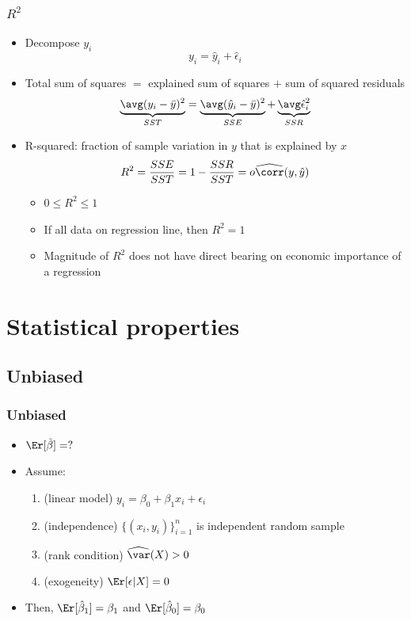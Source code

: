 \begin{frame}
  \frametitle{$R^2$}
  \begin{itemize}
  \item Decompose $y_i$
    \[ y_i = \hat{y}_i + \hat{\epsilon}_i \]
  \item Total sum of squares $=$ explained sum of squares $+$ sum of
    squared residuals
    \[ \underbrace{\avg (y_i - \bar{y})^2}_{SST} =
    \underbrace{\avg (\hat{y}_i - \bar{y})^2}_{SSE} +
    \underbrace{\avg \hat{\epsilon}_i^2}_{SSR} \]
  \item \alert{R-squared}: fraction of sample variation in $y$ that is
    explained by $x$
    \[ R^2 = \frac{SSE}{SST} = 1 - \frac{SSR}{SST} =o
    \widehat{\corr}(y,\hat{y}) \]
    \begin{itemize}
    \item $0 \leq R^2 \leq 1$
    \item If all data on regression line, then $R^2 = 1$
    \item Magnitude of $R^2$ does not have direct bearing on economic
      importance of a regression
    \end{itemize}
  \end{itemize}
\end{frame}

\section{Statistical properties}

\subsection{Unbiased}
\begin{frame}
  \frametitle{Unbiased}
  \begin{itemize}
  \item $\Er[\hat{\beta}] = ?$
  \item Assume:
    \begin{enumerate}
    \item[SLR.1]\label{s1} (linear model) $ y_i = \beta_0 + \beta_1
      x_i + \epsilon_i $
    \item[SLR.2]\label{s2} (independence) $\{(x_i,y_i)\}_{i=1}^n$ is independent random
      sample
    \item[SLR.3]\label{s3} (rank condition) $\widehat{\var}(X) > 0$
    \item[SLR.4]\label{s4} (exogeneity) $\Er[\epsilon | X] = 0$
    \end{enumerate}
  \item Then, $\Er[\hat{\beta}_1] = \beta_1$ and $\Er[\hat{\beta}_0] = \beta_0$
  \end{itemize}
\end{frame}

